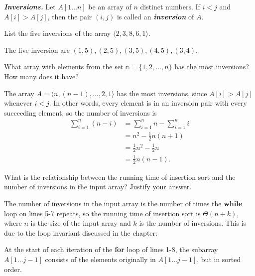 \documentclass[Chapter02]{subfiles}
\begin{document}
\begin{problems}
\begin{problems}
		\end{problems}
		
		\item \textbf{\textit{Inversions.}} Let $A[1 \dots n]$ be an array of $n$ distinct numbers. If $i < j$ and $A[i] > A[j]$, then the pair $(i,j)$ is called an \textbf{\textit{inversion}} of $A$.
		\begin{problems}
			\item List the five inversions of the array $\langle 2, 3, 8, 6, 1 \rangle$.
			\begin{answer}
				The five inversion are $(1,5), (2,5), (3,5), (4,5), (3,4)$.
			\end{answer}

			\item What array with elements from the set $\mathbb{n} = \{1, 2, \dots, n\}$ has the most inversions? How many does it have?
			\begin{answer}
				The array $A = \langle n, (n - 1), \dots, 2, 1 \rangle$ has the most inversions, since $A[i] > A[j]$ whenever $i < j$. In other words, every element is in an inversion pair with every succeeding element, so the number of inversions is
				\begin{align*}
					\sum_{i = 1}^n (n - i) &= \sum_{i = 1}^n n - \sum_{i = 1}^n i\\
						&= n^2 - \frac{1}{2}n(n + 1)\\
						&= \frac{1}{2}n^2 - \frac{1}{2}n\\
						&= \frac{1}{2}n(n - 1).
				\end{align*}
			\end{answer}
			
			\item What is the relationship between the running time of insertion sort and the number of inversions in the input array? Justify your answer.
			\begin{answer}
				The number of inversions in the input array is the number of times the \textbf{while} loop on lines 5-7 repeats, so the running time of insertion sort is $\Theta(n + k)$, where $n$ is the size of the input array and $k$ is the number of inversions. This is due to the loop invariant discussed in the chapter:
				\begin{addmargin}[2em]{2em}
					At the start of each iteration of the \textbf{for} loop of lines 1-8, the subarray $A[1 \dots j-1]$ consists of the elements originally in $A[1 \dots j-1]$, but in sorted order.
				\end{addmargin}


\end{answer}
\end{problems}
\end{problems}
\end{document}
